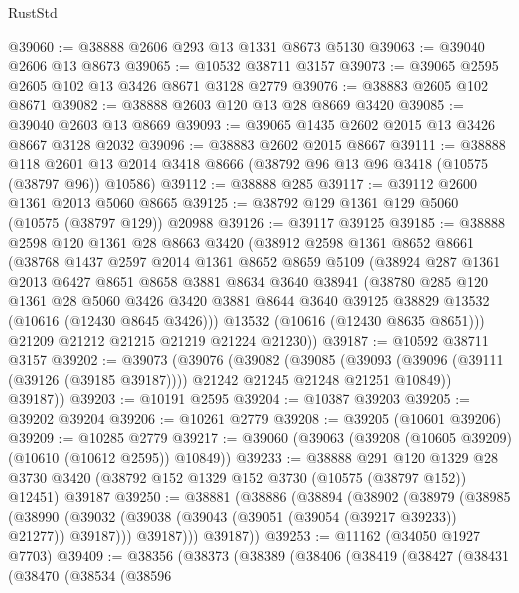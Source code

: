 \begin{lexlean}{RustStd}
\begin{coremodule}
@39060 := @38888 @2606 @293 @13 @1331 @8673 @5130
@39063 := @39040 @2606 @13 @8673
@39065 := @10532 @38711 @3157
@39073 := @39065 @2595 @2605 @102 @13 @3426 @8671 @3128 @2779
@39076 := @38883 @2605 @102 @8671
@39082 := @38888 @2603 @120 @13 @28 @8669 @3420
@39085 := @39040 @2603 @13 @8669
@39093 := @39065 @1435 @2602 @2015 @13 @3426 @8667 @3128 @2032
@39096 := @38883 @2602 @2015 @8667
@39111 := @38888
    @118
    @2601
    @13
    @2014
    @3418
    @8666
    (@38792 @96 @13 @96 @3418 (@10575 (@38797 @96)) @10586)
@39112 := @38888 @285
@39117 := @39112 @2600 @1361 @2013 @5060 @8665
@39125 := @38792 @129 @1361 @129 @5060 (@10575 (@38797 @129)) @20988
@39126 := @39117 @39125
@39185 := @38888
    @2598
    @120
    @1361
    @28
    @8663
    @3420
    (@38912
      @2598
      @1361
      @8652
      @8661
      (@38768
        @1437
        @2597
        @2014
        @1361
        @8652
        @8659
        @5109
        (@38924
          @287
          @1361
          @2013
          @6427
          @8651
          @8658
          @3881
          @8634
          @3640
          @38941
          (@38780
            @285
            @120
            @1361
            @28
            @5060
            @3426
            @3420
            @3881
            @8644
            @3640
            @39125
            @38829
            @13532
            (@10616 (@12430 @8645 @3426)))
          @13532
          (@10616 (@12430 @8635 @8651)))
        @21209
        @21212
        @21215
        @21219
        @21224
        @21230))
@39187 := @10592 @38711 @3157
@39202 := @39073
    (@39076
      (@39082
        (@39085
          (@39093 (@39096 (@39111 (@39126 (@39185 @39187)))) @21242 @21245 @21248 @21251 @10849))
        @39187))
@39203 := @10191 @2595
@39204 := @10387 @39203
@39205 := @39202 @39204
@39206 := @10261 @2779
@39208 := @39205 (@10601 @39206)
@39209 := @10285 @2779
@39217 := @39060 (@39063 (@39208 (@10605 @39209) (@10610 (@10612 @2595)) @10849))
@39233 := @38888
    @291
    @120
    @1329
    @28
    @3730
    @3420
    (@38792 @152 @1329 @152 @3730 (@10575 (@38797 @152)) @12451)
    @39187
@39250 := @38881
    (@38886
      (@38894
        (@38902
          (@38979
            (@38985
              (@38990 (@39032 (@39038 (@39043 (@39051 (@39054 (@39217 @39233)) @21277)) @39187)))
              @39187)))
        @39187))
@39253 := @11162 (@34050 @1927 @7703)
@39409 := @38356
    (@38373
      (@38389
        (@38406
          (@38419
            (@38427
              (@38431
                (@38470
                  (@38534
                    (@38596

\end{coremodule}
\end{lexlean}
